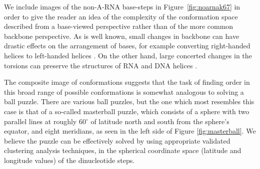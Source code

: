 We    include    images     of    the    non-A-RNA    base-steps    in
Figure~\ref{fig:noarnak67} in order to give  the reader an idea of the
complexity  of the  conformation  space described  from a  base-viewed
perspective rather  than of the more common  backbone perspective.  As
is well known,  small changes in backbone can  have drastic effects on
the arrangement of bases,  for example converting right-handed helices
to  left-handed helices  \cite{olson1976}.  On  the other  hand, large
concerted changes in  the torsions can preserve the  structures of RNA
and DNA helices \cite{olson1981}.

The composite image of conformations suggests that the task of finding
order  in  this broad  range  of  possible  conformations is  somewhat
analogous to solving  a ball puzzle.  There are  various ball puzzles,
but the  one which  most resembles  this case is  that of  a so-called
masterball puzzle, which consists of  a sphere with two parallel lines
at roughly 60$^{\circ}$ of latitude  north and south from the sphere's
equator,  and eight  meridians, as  seen in  the left  side  of Figure
\ref{fig:masterball}. We believe the  puzzle can be effectively solved
by using appropriate validated  clustering analysis techniques, in the
spherical  coordinate space  (latitude  and longitude  values) of  the
dinucleotide steps.


